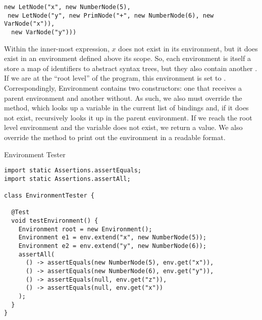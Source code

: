 \begin{verbatim}
new LetNode("x", new NumberNode(5), 
 new LetNode("y", new PrimNode("+", new NumberNode(6), new VarNode("x")), 
  new VarNode("y")))
\end{verbatim}

Within the inner-most  expression, $x$ does not exist in its environment, but it does exist in an environment defined above its scope. So, each environment is itself a store a map of identifiers to abstract syntax trees, but they also contain another . If we are at the ``root level'' of the program, this environment is set to . Correspondingly, Environment contains two constructors: one that receives a parent environment and another without. As such, we also must override the  method, which looks up a variable in the current list of bindings and, if it does not exist, recursively looks it up in the parent environment. If we reach the root level environment and the variable does not exist, we return a  value. We also override the  method to print out the environment in a readable format.

\begin{cl}{Environment Tester}
\begin{lstlisting}[language=MyJava]
import static Assertions.assertEquals;
import static Assertions.assertAll;

class EnvironmentTester {
  
  @Test
  void testEnvironment() {
    Environment root = new Environment();
    Environment e1 = env.extend("x", new NumberNode(5));
    Environment e2 = env.extend("y", new NumberNode(6));
    assertAll(
      () -> assertEquals(new NumberNode(5), env.get("x")),
      () -> assertEquals(new NumberNode(6), env.get("y")),
      () -> assertEquals(null, env.get("z")),
      () -> assertEquals(null, env.get("x"))
    );
  }
}
\end{lstlisting}
\end{cl}

